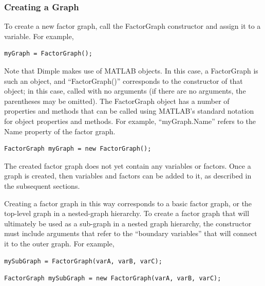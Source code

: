 \subsubsection{Creating a Graph}

To create a new factor graph, call the FactorGraph constructor and assign it to a variable.  For example,

\ifmatlab

\begin{lstlisting}
myGraph = FactorGraph();
\end{lstlisting}

Note that Dimple makes use of MATLAB objects.  In this case, a FactorGraph is such an object, and ``FactorGraph()'' corresponds to the constructor of that object; in this case, called with no arguments (if there are no arguments, the parentheses may be omitted).  The FactorGraph object has a number of properties and methods that can be called using MATLAB's standard notation for object properties and methods.  For example, ``myGraph.Name'' refers to the Name property of the factor graph.

\fi

\ifjava

\begin{lstlisting}
FactorGraph myGraph = new FactorGraph();
\end{lstlisting}

\fi

The created factor graph does not yet contain any variables or factors.  Once a graph is created, then variables and factors can be added to it, as described in the subsequent sections.

Creating a factor graph in this way corresponds to a basic factor graph, or the top-level graph in a nested-graph hierarchy.  To create a factor graph that will ultimately be used as a sub-graph in a nested graph hierarchy, the constructor must include arguments that refer to the ``boundary variables'' that will connect it to the outer graph.  For example,

\ifmatlab

\begin{lstlisting}
mySubGraph = FactorGraph(varA, varB, varC);
\end{lstlisting}

\fi

\ifjava
\begin{lstlisting}
FactorGraph mySubGraph = new FactorGraph(varA, varB, varC);
\end{lstlisting}

